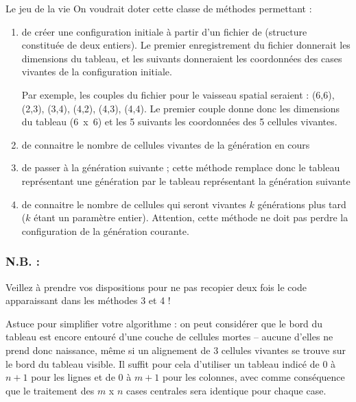 \begin{Exercice}{Le jeu de la vie}
	On voudrait doter cette classe de méthodes permettant :

	\begin{enumerate}
	\item 
		de créer une configuration initiale à partir
		d’un fichier  de 
		(structure constituée de deux entiers). 
		Le premier enregistrement du fichier donnerait les dimensions du tableau,
		et les suivants donneraient les coordonnées des cases vivantes de la
		configuration initiale.
		
		Par exemple, les couples du fichier  pour le vaisseau spatial
		seraient : (6,6), (2,3), (3,4), (4,2), (4,3), (4,4). Le premier couple
		donne donc les dimensions du tableau (6~x~6) et les 5 suivants les
		coordonnées des 5 cellules vivantes.
	\item 
		de connaitre le nombre de cellules vivantes de la génération en cours
	\item
		de passer à la génération suivante ; cette méthode remplace donc le
		tableau représentant une génération par le tableau représentant la
		génération suivante
	\item
		de connaitre le nombre de cellules qui seront
		vivantes $k$ générations plus tard
		($k$ étant un paramètre entier). 
		Attention, cette méthode ne doit pas perdre la configuration de la génération courante.
	\end{enumerate}

	\subsubsection*{N.B. :}

	\begin{liste}
	\item
		Veillez à prendre vos dispositions pour ne pas recopier deux fois le
		code apparaissant dans les méthodes 3 et 4 !
	\item
		Astuce pour simplifier votre algorithme : 
		on peut considérer que le bord du tableau est encore entouré 
		d’une couche de cellules mortes 
		– aucune d’elles ne prend donc naissance, même si un alignement de 3 cellules
		vivantes se trouve sur le bord du tableau visible. 
		Il suffit pour cela d’utiliser un tableau indicé de $0$ à $n+1$ pour les lignes 
		et de $0$ à $m+1$ pour les colonnes, 
		avec comme conséquence que le traitement des $m$ x $n$ cases centrales 
		sera identique pour chaque case.
	\end{liste}

\end{Exercice}

